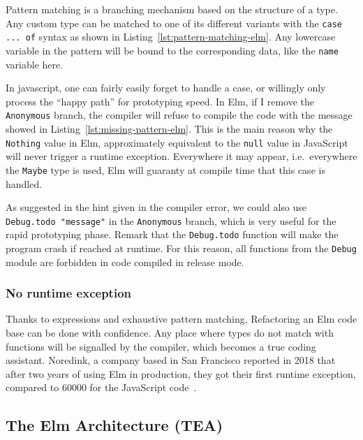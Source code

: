 Pattern matching is a branching mechanism based on the structure of a type.
Any custom type can be matched to one of its different variants
with the \verb|case ... of| syntax as shown in Listing~\ref{lst:pattern-matching-elm}.
Any lowercase variable in the pattern will be bound to the corresponding data,
like the \verb|name| variable here.



In javascript, one can fairly easily forget to handle a case,
or willingly only process the ``happy path'' for prototyping speed.
In Elm, if I remove the \verb|Anonymous| branch,
the compiler will refuse to compile the code
with the message showed in Listing~\ref{lst:missing-pattern-elm}.
This is the main reason why the \verb|Nothing| value in Elm,
approximately equivalent to the \verb|null| value in JavaScript
will never trigger a runtime exception.
Everywhere it may appear, i.e.\ everywhere the \verb|Maybe| type is used,
Elm will guaranty at compile time that this case is handled.



As suggested in the hint given in the compiler error,
we could also use \verb|Debug.todo "message"| in the \verb|Anonymous| branch,
which is very useful for the rapid prototyping phase.
Remark that the \verb|Debug.todo| function will make the program crash
if reached at runtime.
For this reason, all functions from the \verb|Debug| module
are forbidden in code compiled in release mode.


\subsubsection{No runtime exception}%
\label{ssub:no_runtime_exception}

Thanks to expressions and exhaustive pattern matching,
Refactoring an Elm code base can be done with confidence.
Any place where types do not match with functions
will be signalled by the compiler, which becomes a true coding assistant.
Noredink, a company based in San Francisco reported in 2018 that after
two years of using Elm in production,
they got their first runtime exception,
compared to 60000 for the JavaScript code~\cite{zeroruntimeerror}.


\subsection{The Elm Architecture (TEA)}%
\label{sub:the_elm_architecture_tea_}


